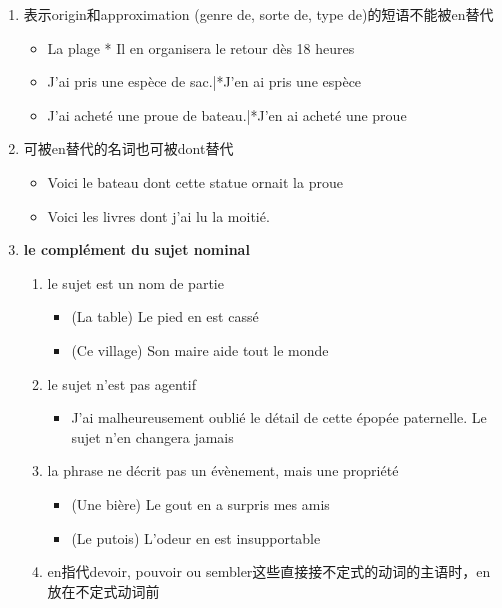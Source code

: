 \documentclass[UTF8]{report}
\begin{document}
\begin{enumerate}
\begin{itemize}
    \end{itemize}
    \begin{enumerate}
        \item 表示origin和approximation (genre de, sorte de, type de)的短语不能被en替代
        \begin{itemize}
            \item La plage * Il en organisera le retour dès 18 heures
            \item J’ai pris une espèce de sac.|*J’en ai pris une espèce
            \item J’ai acheté une proue de bateau.|*J’en ai acheté une proue
        \end{itemize}
        \item 可被en替代的名词也可被dont替代
        \begin{itemize}
            \item Voici le bateau dont cette statue ornait la proue
            \item Voici les livres dont j’ai lu la moitié.
        \end{itemize}
        \item \textbf{le complément du sujet nominal}
        \begin{enumerate}
            \item le sujet est un nom de partie
            \begin{itemize}
                \item (La table) Le pied en est cassé
                \item (Ce village) Son maire aide tout le monde
            \end{itemize}
            \item le sujet n’est pas agentif
            \begin{itemize}
                \item J’ai malheureusement oublié le détail de cette épopée paternelle. Le sujet n’en changera jamais
            \end{itemize}
            \item la phrase ne décrit pas un évènement, mais une propriété
            \begin{itemize}
                \item (Une bière) Le gout en a surpris mes amis
                \item (Le putois) L’odeur en est insupportable
            \end{itemize}
            \item en指代devoir, pouvoir ou sembler这些直接接不定式的动词的主语时，en放在不定式动词前

\end{enumerate}
\end{enumerate}
\end{enumerate}
\end{document}
